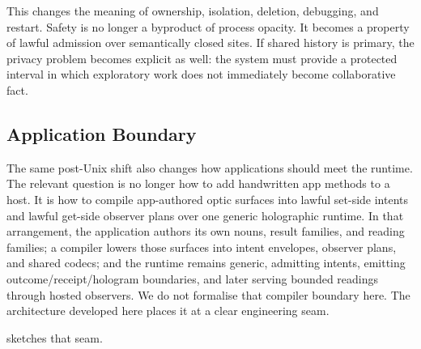 \documentclass{aion}
\begin{document}
This changes the meaning of ownership, isolation, deletion, debugging, and restart. Safety is no longer a byproduct of process opacity. It becomes a property of lawful admission over semantically closed sites. If shared history is primary, the privacy problem becomes explicit as well: the system must provide a protected interval in which exploratory work does not immediately become collaborative fact.

\subsection{Application Boundary}
The same post-Unix shift also changes how applications should meet the runtime.
The relevant question is no longer how to add handwritten app methods to a host.
It is how to compile app-authored optic surfaces into lawful set-side intents
and lawful get-side observer plans over one generic holographic runtime. In
that arrangement, the application authors its own nouns, result families, and
reading families; a compiler lowers those surfaces into intent envelopes,
observer plans, and shared codecs; and the runtime remains generic, admitting
	intents, emitting outcome/receipt/hologram boundaries, and later serving
	bounded readings through hosted observers. We do not formalise that
	compiler boundary here. The architecture developed here places it at a clear
	engineering seam.

	 sketches that seam.
\end{document}
